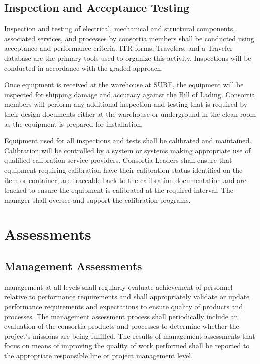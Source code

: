 \subsection{Inspection and Acceptance Testing}

Inspection and testing of electrical, mechanical and structural
components, associated services, and processes by consortia members
shall be conducted using acceptance and performance criteria. ITR
forms, Travelers, and a Traveler database are the primary tools used
to organize this activity. Inspections will be conducted in accordance
with the graded approach.

Once equipment is received at the warehouse at SURF, the equipment will 
be inspected for shipping damage and accuracy against the Bill of Lading. 
Consortia members will perform any additional inspection and testing that 
is required by their design documents either at the warehouse or 
underground in the clean room as the equipment is prepared for 
installation.

Equipment used for all inspections and tests shall be calibrated and
maintained. Calibration will be controlled by a system or systems
making appropriate use of qualified calibration service
providers. Consortia Leaders shall ensure that equipment requiring
calibration have their calibration status identified on the item or
container, are traceable back to the calibration documentation and are
tracked to ensure the equipment is calibrated at the required
interval. The   manager shall
oversee and support the  calibration programs.

\section{Assessments}

\subsection{Management Assessments}

 management at all levels shall regularly evaluate
achievement of personnel relative to performance requirements and
shall appropriately validate or update performance requirements and
expectations to ensure quality of products and processes. The
management assessment process shall periodically include an evaluation
of the consortia products and processes to determine whether the
project's missions are being fulfilled. The results of management
assessments that focus on means of improving the quality of work
performed shall be reported to the appropriate responsible line or
project management level.

